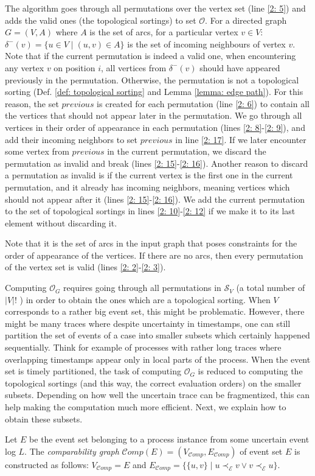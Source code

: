 The algorithm goes through all permutations over the vertex set (line \ref{2: 5}) and adds the valid ones (the topological sortings) to set $\mathcal{O}$.
For a directed graph $G=(V,A)$ where $A$ is the set of arcs, for a particular vertex $v \in V$: 
$\delta^-(v)=\{u \in V \mid (u,v) \in A\}$ is the set of incoming neighbours of vertex $v$.
Note that if the current permutation is indeed a valid one, when encountering any vertex $v$ on position $i$, all vertices from $\delta^-(v)$ should have appeared previously in the permutation.
Otherwise, the permutation is not a topological sorting (Def. \ref{def: topological sorting} and Lemma \ref{lemma: edge path}).
For this reason, the set $previous$ is created for each permutation (line \ref{2: 6}) to contain all the vertices that should not appear later in the permutation.
We go through all vertices in their order of appearance in each permutation (lines \ref{2: 8}-\ref{2: 9}), and add their incoming neighbors to set $previous$ in line \ref{2: 17}.
If we later encounter some vertex from $previous$ in the current permutation, we discard the permutation as invalid and break (lines \ref{2: 15}-\ref{2: 16}).
Another reason to discard a permutation as invalid is if the current vertex is the first one in the current permutation, and it already has incoming neighbors, meaning vertices which should not appear after it (lines \ref{2: 15}-\ref{2: 16}).
We add the current permutation to the set of topological sortings in lines \ref{2: 10}-\ref{2: 12} if we make it to its last element without discarding it.

Note that it is the set of arcs in the input graph that poses constraints for the order of appearance of the vertices. 
If there are no arcs, then every permutation of the vertex set is valid (lines \ref{2: 2}-\ref{2: 3}). 

Computing $\mathcal{O}_G$ requires going through all permutations in $\mathcal{S}_V$ (a total number of $|V|!$ ) in order to obtain the ones which are a topological sorting.
When $V$ corresponds to a rather big event set, this might be problematic.
However, there might be many traces where despite uncertainty in timestamps, one can still partition the set of events of a case into smaller subsets which certainly happened sequentially. 
Think for example of processes with rather long traces where overlapping timestamps appear only in local parts of the process.
When the event set is timely partitioned, the task of computing $\mathcal{O}_G$ is reduced to computing the topological sortings (and this way, the correct evaluation orders) on the smaller subsets.
Depending on how well the uncertain trace can be fragmentized, this can help making the computation much more efficient.
Next, we explain how to obtain these subsets.
\pagebreak
%
%
% 
\begin{definition}\label{def: comparability graph}
Let $E$ be the event set belonging to a process instance from some uncertain event log $L$.
The \emph{comparability graph} $\mathcal{C}omp(E)=(V_{\mathcal{C}omp},E_{\mathcal{C}omp})$ of event set $E$ is constructed as follows:
$V_{\mathcal{C}omp} = E$ and
$E_{\mathcal{C}omp} = \{ \{u,v\} \mid u \prec_{\mathcal{E}} v \vee v \prec_{\mathcal{E}} u\}$.
\end{definition}

